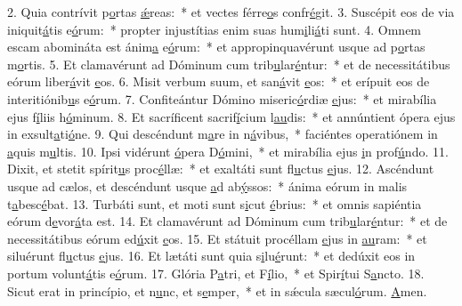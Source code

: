 2. Quia contrívit p\uline{o}rtas \uline{ǽ}reas:~* et vectes férre\uline{o}s confr\uline{é}git.
3. Suscépit eos de via iniquit\uline{á}tis e\uline{ó}rum:~* propter injustítias enim suas hum\uline{i}li\uline{á}ti sunt.
4. Omnem escam abomináta est ánim\uline{a} e\uline{ó}rum:~* et appropinquavérunt usque ad p\uline{o}rtas m\uline{o}rtis.
5. Et clamavérunt ad Dóminum cum trib\uline{u}lar\uline{é}ntur:~* et de necessitátibus eórum liber\uline{á}vit \uline{e}os.
6. Misit verbum suum, et san\uline{á}vit \uline{e}os:~* et erípuit eos de interitiónib\uline{u}s e\uline{ó}rum.
7. Confiteántur Dómino miseric\uline{ó}rdiæ \uline{e}jus:~* et mirabília ejus f\uline{í}liis h\uline{ó}minum.
8. Et sacríficent sacrif\uline{í}cium l\uline{au}dis:~* et annúntient ópera ejus in exsult\uline{a}ti\uline{ó}ne.
9. Qui descéndunt m\uline{a}re in n\uline{á}vibus,~* faciéntes operatiónem in \uline{a}quis m\uline{u}ltis.
10. Ipsi vidérunt \uline{ó}pera D\uline{ó}mini,~* et mirabília ejus \uline{i}n prof\uline{ú}ndo.
11. Dixit, et stetit spírit\uline{u}s proc\uline{é}llæ:~* et exaltáti sunt fl\uline{u}ctus \uline{e}jus.
12. Ascéndunt usque ad cælos, et descéndunt usque \uline{a}d ab\uline{ý}ssos:~* ánima eórum in malis t\uline{a}besc\uline{é}bat.
13. Turbáti sunt, et moti sunt s\uline{i}cut \uline{é}brius:~* et omnis sapiéntia eórum d\uline{e}vor\uline{á}ta est.
14. Et clamavérunt ad Dóminum cum trib\uline{u}lar\uline{é}ntur:~* et de necessitátibus eórum ed\uline{ú}xit \uline{e}os.
15. Et státuit procéllam \uline{e}jus in \uline{au}ram:~* et siluérunt fl\uline{u}ctus \uline{e}jus.
16. Et lætáti sunt quia s\uline{i}lu\uline{é}runt:~* et dedúxit eos in portum volunt\uline{á}tis e\uline{ó}rum.
17. Glória P\uline{a}tri, et F\uline{í}lio,~* et Spir\uline{í}tui S\uline{a}ncto.
18. Sicut erat in princípio, et n\uline{u}nc, et s\uline{e}mper,~* et in sǽcula sæcul\uline{ó}rum. \uline{A}men.
